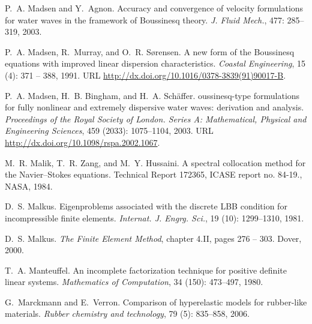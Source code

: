 \begin{thebibliography}{467}
P.~A. Madsen and Y.~Agnon.
\newblock Accuracy and convergence of velocity formulations for water waves in
  the framework of {B}oussinesq theory.
\newblock \emph{J. Fluid Mech.}, 477: 285--319, 2003.

P.~A. Madsen, R.~Murray, and O.~R. S{\o}rensen.
\newblock A new form of the {B}oussinesq equations with improved linear
  dispersion characteristics.
\newblock \emph{Coastal Engineering}, 15 (4): 371 -- 388,
  1991.
\newblock URL \url{http://dx.doi.org/10.1016/0378-3839(91)90017-B}.

P.~A. Madsen, H.~B. Bingham, and H.~A. Sch{\"a}ffer.
oussinesq-type formulations for fully nonlinear and extremely
  dispersive water waves: derivation and analysis.
\newblock \emph{Proceedings of the Royal Society of London. Series A:
  Mathematical, Physical and Engineering Sciences}, 459
  (2033): 1075--1104, 2003.
\newblock URL \url{http://dx.doi.org/10.1098/rspa.2002.1067}.

M.~R. Malik, T.~R. Zang, and M.~Y. Hussaini.
\newblock A spectral collocation method for the {N}avier--{S}tokes equations.
\newblock Technical Report 172365, ICASE report no. 84-19., NASA, 1984.

D.~S. Malkus.
\newblock Eigenproblems associated with the discrete {LBB} condition for
  incompressible finite elements.
\newblock \emph{Internat. J. Engrg. Sci.}, 19 (10):
  1299--1310, 1981.

D.~S. Malkus.
\newblock \emph{The Finite Element Method}, chapter 4.II, pages 276 -- 303.
\newblock Dover, 2000.

T.~A. Manteuffel.
\newblock An incomplete factorization technique for positive definite linear
  systems.
\newblock \emph{Mathematics of Computation}, 34 (150):
  473--497, 1980.

G.~Marckmann and E.~Verron.
\newblock Comparison of hyperelastic models for rubber-like materials.
\newblock \emph{Rubber chemistry and technology}, 79 (5):
  835--858, 2006.


\end{thebibliography}
